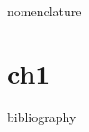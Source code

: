 \documentclass[a4paper]{report}
\begin{document}
{nomenclature}

\printnomenclature

\chapter{ch1}

{bibliography}
\end{document}

